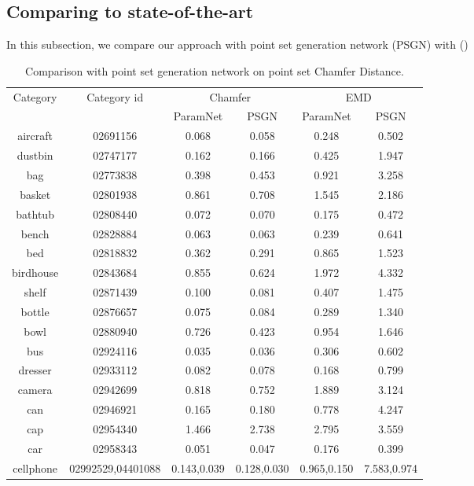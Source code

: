 \subsection{Comparing to state-of-the-art}
In this subsection, we compare our approach with point set generation network (PSGN)\cite{PSGN} 
with (\cite{3Drender})
\begin{table*}
	\caption{Comparison with point set generation network on point set Chamfer Distance. }
	\label{tab:seg}
	\centering
	\begin{tabular}{c c c c c c}
		\multirow{2}{*}{Category} & \multirow{2}{*}{Category id} & \multicolumn{2}{c}{Chamfer} & \multicolumn{2}{c}{EMD}\\ \cmidrule(lr){3-4} \cmidrule(lr){5-6}
			&	& ParamNet & PSGN\cite{PSGN}       & ParamNet & PSGN\cite{PSGN}\\
		\hline
		aircraft & 02691156 & 0.068 & 0.058 & 0.248 & 0.502 \\   
		dustbin & 02747177 & 0.162 & 0.166 & 0.425 & 1.947 \\
		bag & 02773838  & 0.398 & 0.453 & 0.921 & 3.258 \\
		basket & 02801938 & 0.861 & 0.708 & 1.545 & 2.186 \\
		bathtub & 02808440 & 0.072 & 0.070 & 0.175 & 0.472 \\
		bench & 02828884 & 0.063 & 0.063 & 0.239 & 0.641 \\
		bed & 02818832 & 0.362 & 0.291 & 0.865 & 1.523 \\
		birdhouse & 02843684 & 0.855 & 0.624 & 1.972 & 4.332 \\
		shelf & 02871439 & 0.100 & 0.081 & 0.407 & 1.475 \\
		bottle & 02876657 & 0.075 & 0.084 & 0.289 & 1.340 \\
		bowl & 02880940 & 0.726 & 0.423 & 0.954 & 1.646 \\
		bus & 02924116 & 0.035 & 0.036 & 0.306 & 0.602\\
		dresser & 02933112 & 0.082 & 0.078 & 0.168 & 0.799 \\
		camera & 02942699 & 0.818 & 0.752 & 1.889 & 3.124 \\
		can & 02946921 & 0.165 & 0.180 & 0.778 & 4.247 \\
		cap & 02954340 & 1.466 & 2.738 & 2.795 & 3.559 \\
		car & 02958343 & 0.051 & 0.047 & 0.176 & 0.399 \\
		cellphone & 02992529,04401088 & 0.143,0.039 & 0.128,0.030& 0.965,0.150 & 7.583,0.974\\

\end{tabular}
\end{table*}
